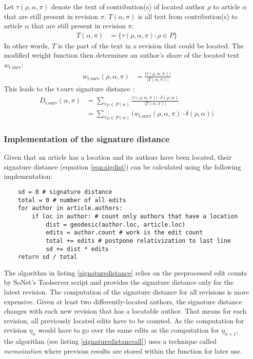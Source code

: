 Let $\tau(\rho,\alpha,\pi)$ denote the text of contribution(s) of located author $\rho$ to article $\alpha$ that are still present in revision $\pi$.
$T(\alpha,\pi)$ is all text from contribution(s) to article $\alpha$ that are still present in revision $\pi$:
\begin{align*}
T(\alpha,\pi) &= \{\tau(\rho,\alpha,\pi) : \rho \in P\}
\end{align*}
In other words, $T$ is the part of the text in a revision that could be located.
The modified weight function then determines an author's share of the located text $w_{\text{t.surv}}$: 
\begin{align*}
w_{\text{t.surv}}(\rho,\alpha,\pi) &= \frac{|\tau(\rho,\alpha,\pi)|}{|T(\alpha,\pi)|}
\end{align*}
This leads to the t.surv signature distance :
\begin{equation}\label{eqn:sigdistsurvivaltext}
\begin{split}
D_{\text{t.surv}}(\alpha,\pi) & = \sum_{\forall \rho \in P(\alpha)} \frac{|\tau(\rho,\alpha,\pi)| \cdot \delta(\rho,\alpha)}{|T(\alpha,\pi)|} \\
 & =  \sum_{\forall \rho \in P(\alpha)} \big(w_{\text{t.surv}}(\rho,\alpha,\pi) \cdot \delta(\rho,\alpha)\big)
 \end{split}
\end{equation}


\subsubsection{Implementation of the signature distance}

Given that an article has a location and its authors have been located, their signature distance (equation \ref{eqn:sigdist}) can be calculated using the following implementation:

\begin{lstlisting}
	sd = 0 # signature distance
	total = 0 # number of all edits
	for author in article.authors:
		if loc in author: # count only authors that have a location
			dist = geodesic(author.loc, article.loc)
			edits = author.count # work is the edit count
			total += edits # postpone relativization to last line 
			sd += dist * edits
	return sd / total
\end{lstlisting}

The algorithm in listing \ref{signaturedistance} relies on the preprocessed edit counts by SoNet's Toolserver script and provides the signature distance only for the latest revision. 
The computation of the signature distance for all revisions is more expensive.
Given at least two differently-located authors, the signature distance changes with each new revision that has a locatable author.
That means for each revision, all previously located edits have to be counted.
As the computation for revision $\eta_{n}$ would have to go over the same edits as the computation for $\eta_{n+1}$, the algorithm (see listing \ref{signaturedistanceall}) uses a technique called \emph{memoization} where previous results are stored within the function for later use.

